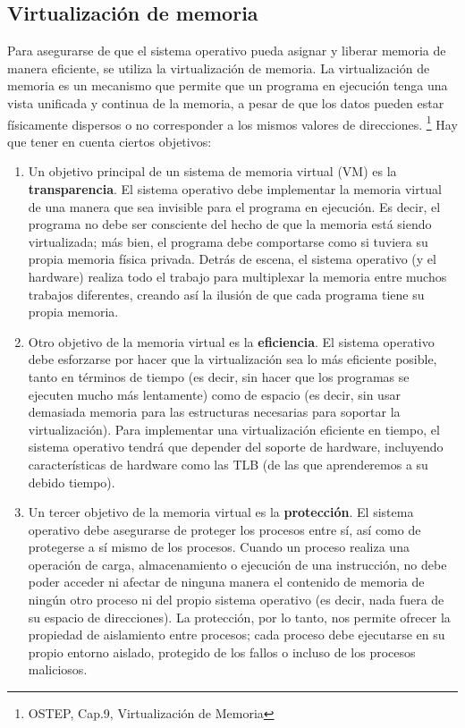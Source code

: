 \documentclass{article}
\begin{document}
\subsection{Virtualización de memoria}
Para asegurarse de que el sistema operativo pueda asignar y liberar memoria de manera eficiente, se utiliza la virtualización de memoria. La virtualización de memoria es un mecanismo que permite que un programa en ejecución tenga una vista unificada y continua de la memoria, a pesar de que los datos pueden estar físicamente dispersos o no corresponder a los mismos valores de direcciones. \footnote{OSTEP, Cap.9, Virtualización de Memoria} Hay que tener en cuenta ciertos objetivos:
\begin{enumerate}
    \item Un objetivo principal de un sistema de memoria virtual (VM) es la \textbf{transparencia}. El sistema operativo debe implementar la memoria virtual de una manera que sea invisible para el programa en ejecución. Es decir, el programa no debe ser consciente del hecho de que la memoria está siendo virtualizada; más bien, el programa debe comportarse como si tuviera su propia memoria física privada. Detrás de escena, el sistema operativo (y el hardware) realiza todo el trabajo para multiplexar la memoria entre muchos trabajos diferentes, creando así la ilusión de que cada programa tiene su propia memoria.
    \item Otro objetivo de la memoria virtual es la \textbf{eficiencia}. El sistema operativo debe esforzarse por hacer que la virtualización sea lo más eficiente posible, tanto en términos de tiempo (es decir, sin hacer que los programas se ejecuten mucho más lentamente) como de espacio (es decir, sin usar demasiada memoria para las estructuras necesarias para soportar la virtualización). Para implementar una virtualización eficiente en tiempo, el sistema operativo tendrá que depender del soporte de hardware, incluyendo características de hardware como las TLB (de las que aprenderemos a su debido tiempo).
    \item Un tercer objetivo de la memoria virtual es la \textbf{protección}. El sistema operativo debe asegurarse de proteger los procesos entre sí, así como de protegerse a sí mismo de los procesos. Cuando un proceso realiza una operación de carga, almacenamiento o ejecución de una instrucción, no debe poder acceder ni afectar de ninguna manera el contenido de memoria de ningún otro proceso ni del propio sistema operativo (es decir, nada fuera de su espacio de direcciones). La protección, por lo tanto, nos permite ofrecer la propiedad de aislamiento entre procesos; cada proceso debe ejecutarse en su propio entorno aislado, protegido de los fallos o incluso de los procesos maliciosos.
\end{enumerate}
\end{document}
